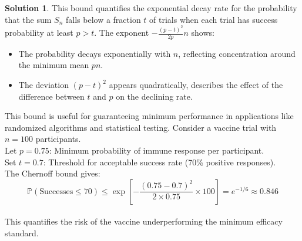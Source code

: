 \documentclass[12pt]{article}
\theoremstyle{definition}
\newtheorem*{solution}{\normalfont\textbf{Solution}}
\newcommand{\prob}{\mathbb{P}}
\begin{document}
\begin{enumerate}[leftmargin=*]
\begin{solution}
            This bound quantifies the exponential decay rate for the probability that the sum \(S_n\) falls below a fraction \(t\) of trials when each trial has success probability at least \(p > t\). The exponent \(-\frac{(p-t)^2}{2p}n\) shows:
            \begin{itemize}
                \item The probability decays exponentially with \(n\), reflecting concentration around the minimum mean \(pn\).
                \item The deviation \((p-t)^2\) appears quadratically, describes the effect of the difference between \(t\) and \(p\) on the declining rate.
            \end{itemize}
            This bound is useful for guaranteeing minimum performance in applications like randomized algorithms and statistical testing. 
            Consider a vaccine trial with \(n = 100\) participants. \\
            Let \(p = 0.75\): Minimum probability of immune response per participant. \\
            Set \(t = 0.7\): Threshold for acceptable success rate (70\% positive responses). \\
            The Chernoff bound gives: \\
            \[
            \prob(\text{Successes} \leq 70) \leq \exp\left[-\frac{(0.75 - 0.7)^2}{2 \times 0.75} \times 100\right] = e^{-1/6} \approx 0.846
            \] \\
            This quantifies the risk of the vaccine underperforming the minimum efficacy standard.
        \end{solution}


\end{enumerate}
\end{document}

